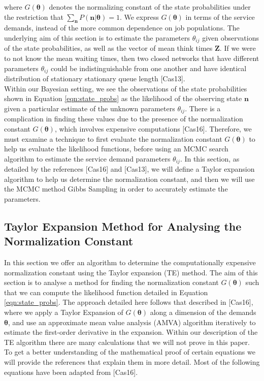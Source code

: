 \documentclass[a4paper,11pt,titlepage]{article}
\begin{document}
where $G(\bm{\theta})$ denotes the normalizing constant of the state probabilities under the restriction that $\sum_{\mathbf{n}} P(\mathbf{n}|\bm{\theta}) = 1 $. We express $G(\bm{\theta})$ in terms of the service demands, instead of the more common dependence on job populations. The underlying aim of this section is to estimate the parameters $\theta_{ij}$ given observations of the state probabilities, as well as the vector of mean think times $\mathbf{Z}$. If we were to not know the mean waiting times, then two closed networks that have different parameters $\theta_{ij}$ could be indistinguishable from one another and have identical distribution of stationary stationary queue length [Cas13]. \\

Within our Bayesian setting, we see the observations of the state probabilities shown in Equation \ref{eqn:state_probs} as the likelihood of the observing state $\mathbf{n}$ given a particular estimate of the unknown parameters $\theta_{ij}$. There is a complication in finding these values due to the presence of the normalization constant $G(\bm{\theta})$, which involves expensive computations [Cas16]. Therefore, we must examine a technique to first evaluate the normalization constant $G(\bm{\theta})$ to help us evaluate the likelihood functions, before using an MCMC search algorithm to estimate the service demand parameters $\theta_{ij}$. In this section, as detailed by the references [Cas16] and [Cas13], we will define a Taylor expansion algorithm to help us determine the normalization constant, and then we will use the MCMC method Gibbs Sampling in order to accurately estimate the parameters. 

\subsection{Taylor Expansion Method for Analysing the Normalization Constant}

In this section we offer an algorithm to determine the computationally expensive normalization constant using the Taylor expansion (TE) method. The aim of this section is to analyse a method for finding the normalization constant $G(\bm{\theta})$ such that we can compute the likelihood function detailed in Equation \ref{eqn:state_probs}. The approach detailed here follows that described in [Cas16], where we apply a Taylor Expansion of $G(\bm{\theta})$ along a dimension of the demands $\bm{\theta}$, and use an approximate mean value analysis (AMVA) algorithm iteratively to estimate the first-order derivative in the expansion. Within our description of the TE algorithm there are many calculations that we will not prove in this paper. To get a better understanding of the mathematical proof of certain equations we will provide the references that explain them in more detail. Most of the following equations have been adapted from [Cas16]. \\
\end{document}
